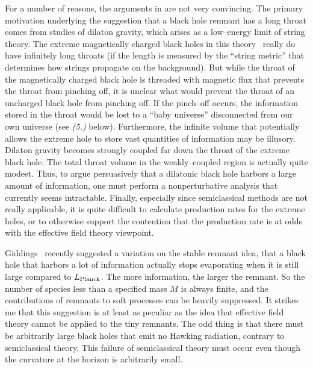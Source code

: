 For a number of reasons, the arguments in  are not very
convincing.
The primary motivation underlying the suggestion that a black hole remnant has
a long throat comes from studies of dilaton gravity, which arises as a
low--energy limit of string theory.  The extreme magnetically charged black
holes in this theory\lref{}\lref{}~
really do have infinitely long throats (if the length is measured by the
``string metric'' that determines how strings propagate on the background).
But while the throat of the magnetically charged black hole is threaded with
magnetic flux that prevents the throat from pinching off, it is unclear what
would prevent the throat of an uncharged black hole from pinching off.  If the
pinch--off occurs,  the information stored in the throat would be lost to a
``baby universe'' disconnected from our own universe (see {\it (5.)} below).
Furthermore, the infinite volume that potentially allows the extreme hole to
store vast quantities of information may be illusory.  Dilaton gravity becomes
strongly coupled far down the throat of the extreme black hole.  The total
throat volume in the weakly--coupled region is actually quite modest.  Thus, to
argue persuasively that a dilatonic black hole harbors a large amount of
information, one must perform a nonperturbative analysis that currently seems
intractable.  Finally, especially since semiclassical methods are not really
applicable, it is quite difficult to calculate production rates for the extreme
holes, or to otherwise support the contention that the production rate is at
odds with the effective field theory viewpoint.

Giddings \giddings\ recently suggested a variation on the stable remnant idea,
that a
black hole that harbors a lot of information actually stops evaporating when it
is still large compared to $L_{\rm Planck}$.  The more information, the larger
the remnant.  So the number of species less than a specified mass $M$ is always
finite, and the contributions of remnants to soft processes can be heavily
suppressed.  It strikes me that this suggestion is at least as peculiar as the
idea that effective field theory cannot be applied to the tiny remnants.  The
odd thing is that there must be arbitrarily large black holes that emit no
Hawking radiation, contrary to semiclassical theory.  This failure of
semiclassical theory must occur even though the curvature at the horizon is
arbitrarily small.

